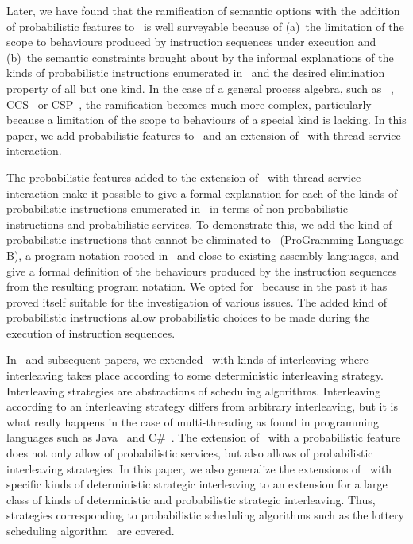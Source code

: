 \documentclass{llncs}
\begin{document}
Later, we have found that the ramification of semantic options with 
the addition of probabilistic features to \BTA\ is well surveyable
because of 
(a)~the limitation of the scope to behaviours produced by instruction
sequences under execution and
(b)~the semantic constraints brought about by the informal explanations 
of the kinds of probabilistic instructions enumerated in~\cite{BM09f} 
and the desired elimination property of all but one kind.
In the case of a general process algebra, such as \ACP~\cite{BW90}, 
CCS~\cite{Mil89} or CSP~\cite{Hoa85}, the ramification becomes much more 
complex, particularly because a limitation of the scope to behaviours of 
a special kind is lacking.
In this paper, we add probabilistic features to \BTA\ and an extension 
of \BTA\ with thread-service interaction.

The probabilistic features added to the extension of \BTA\ with 
thread-service interaction make it possible to give a formal explanation 
for each of the kinds of probabilistic instructions enumerated 
in~\cite{BM09f} in terms of non-probabilistic instructions and 
probabilistic services.
To demonstrate this, we add the kind of probabilistic instructions that 
cannot be eliminated to \PGLB\ (ProGramming Language B), a program 
notation rooted in \PGA\ and close to existing assembly languages, and 
give a formal definition of the behaviours produced by the instruction 
sequences from the resulting program notation.
We opted for \PGLB\ because in the past it has proved itself suitable 
for the investigation of various issues.
The added kind of probabilistic instructions allow probabilistic choices 
to be made during the execution of instruction sequences. 

In~\cite{BM04c} and subsequent papers, we extended \BTA\ with kinds of 
interleaving where interleaving takes place according to some 
deterministic interleaving strategy.
Interleaving strategies are abstractions of scheduling algorithms.
Interleaving according to an interleaving strategy differs from 
arbitrary interleaving, but it is what really happens in the case of 
multi-threading as found in programming languages such as 
Java~\cite{GJSB00a} and C\#~\cite{HWG03a}.
The extension of \BTA\ with a probabilistic feature does not only allow
of probabilistic services, but also allows of probabilistic interleaving
strategies.
In this paper, we also generalize the extensions of \BTA\ with specific 
kinds of deterministic strategic interleaving to an extension for a 
large class of kinds of deterministic and probabilistic strategic 
interleaving.
Thus, strategies corresponding to probabilistic scheduling algorithms
such as the lottery scheduling algorithm~\cite{WW94a} are covered.
\end{document}
